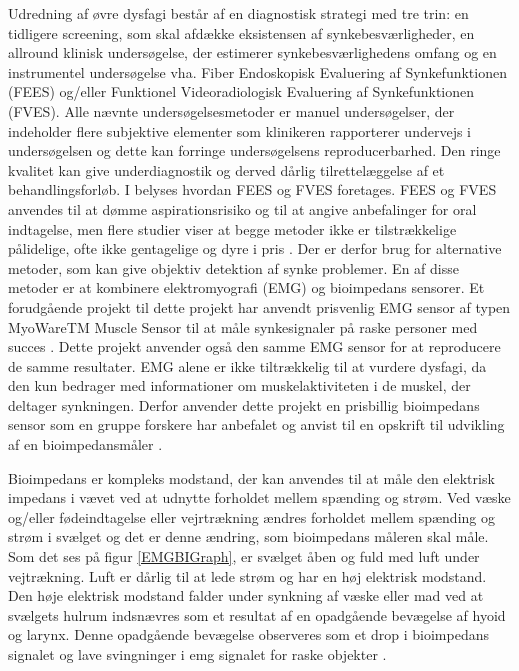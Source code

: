   Udredning af øvre dysfagi består af en diagnostisk strategi med tre trin: en tidligere screening, som skal afdække eksistensen af synkebesværligheder, en allround klinisk undersøgelse, der estimerer synkebesværlighedens omfang og en instrumentel undersøgelse vha. Fiber Endoskopisk Evaluering af Synkefunktionen (FEES) og/eller Funktionel Videoradiologisk Evaluering af Synkefunktionen (FVES). Alle nævnte undersøgelsesmetoder er manuel undersøgelser, der indeholder flere subjektive elementer som klinikeren rapporterer undervejs i undersøgelsen og dette kan forringe undersøgelsens reproducerbarhed. Den ringe kvalitet kan give underdiagnostik og derved dårlig tilrettelæggelse af et behandlingsforløb. I  belyses hvordan FEES og FVES foretages. FEES og FVES anvendes til at dømme aspirationsrisiko og til at angive anbefalinger for oral indtagelse, men flere studier viser at begge metoder ikke er tilstrækkelige pålidelige,  ofte ikke gentagelige og dyre i pris \cite{Kelly2006} \cite{McCullough2001Inter-Measures} \cite{Schultheiss2014} \cite{Nahrstaedt2012SwallowMeasurements}.  Der er derfor brug for alternative metoder, som kan give objektiv detektion af synke problemer. En af disse metoder er at kombinere elektromyografi (EMG) og bioimpedans sensorer. Et forudgående projekt til dette projekt har anvendt prisvenlig EMG sensor af typen MyoWareTM Muscle Sensor til at måle synkesignaler på raske personer med succes \cite[s. 58]{ChristensenElisabethLundbakStrand2017}. Dette projekt anvender også den samme EMG sensor for at reproducere de samme resultater. EMG alene er ikke tiltrækkelig til at vurdere dysfagi, da den kun bedrager med informationer om muskelaktiviteten i de muskel, der deltager synkningen. Derfor anvender dette projekt en prisbillig bioimpedans sensor som en gruppe forskere har anbefalet og anvist til en opskrift til udvikling af en bioimpedansmåler \cite{Aroom2009}.

Bioimpedans er kompleks modstand, der kan anvendes til at måle den elektrisk impedans i vævet ved at udnytte forholdet mellem spænding og strøm. Ved væske og/eller fødeindtagelse eller vejrtrækning ændres forholdet mellem spænding og strøm i svælget og det er denne ændring, som bioimpedans måleren skal måle. Som det ses på figur \ref{EMGBIGraph}, er svælget åben og fuld med luft under vejtrækning. Luft er dårlig til at lede strøm og har en høj elektrisk modstand. Den høje elektrisk modstand falder under synkning af væske eller mad ved at svælgets hulrum indsnævres som et resultat af en opadgående bevægelse af hyoid og larynx. Denne opadgående bevægelse observeres som et drop i bioimpedans signalet og lave svingninger i emg signalet for raske objekter \cite{Schultheiss2014}.          



